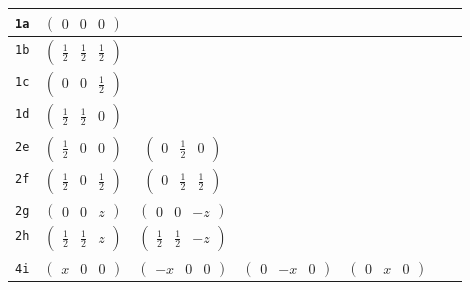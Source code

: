 \documentclass[fleqn,9pt,landscape]{jsarticle}
\begin{document}
\begin{center}
\begin{longtable}{ccccccc}
{\tt 1a} & $ \begin{pmatrix} 0 & 0 & 0 \end{pmatrix} $ & $  $ & $  $ & $  $ & $  $ & $  $ \\ \hline
{\tt 1b} & $ \begin{pmatrix} \frac{1}{2} & \frac{1}{2} & \frac{1}{2} \end{pmatrix} $ & $  $ & $  $ & $  $ & $  $ & $  $ \\ \hline
{\tt 1c} & $ \begin{pmatrix} 0 & 0 & \frac{1}{2} \end{pmatrix} $ & $  $ & $  $ & $  $ & $  $ & $  $ \\ \hline
{\tt 1d} & $ \begin{pmatrix} \frac{1}{2} & \frac{1}{2} & 0 \end{pmatrix} $ & $  $ & $  $ & $  $ & $  $ & $  $ \\ \hline
{\tt 2e} & $ \begin{pmatrix} \frac{1}{2} & 0 & 0 \end{pmatrix} $ & $ \begin{pmatrix} 0 & \frac{1}{2} & 0 \end{pmatrix} $ & $  $ & $  $ & $  $ & $  $ \\ \hline
{\tt 2f} & $ \begin{pmatrix} \frac{1}{2} & 0 & \frac{1}{2} \end{pmatrix} $ & $ \begin{pmatrix} 0 & \frac{1}{2} & \frac{1}{2} \end{pmatrix} $ & $  $ & $  $ & $  $ & $  $ \\ \hline
{\tt 2g} & $ \begin{pmatrix} 0 & 0 & z \end{pmatrix} $ & $ \begin{pmatrix} 0 & 0 & - z \end{pmatrix} $ & $  $ & $  $ & $  $ & $  $ \\ \hline
{\tt 2h} & $ \begin{pmatrix} \frac{1}{2} & \frac{1}{2} & z \end{pmatrix} $ & $ \begin{pmatrix} \frac{1}{2} & \frac{1}{2} & - z \end{pmatrix} $ & $  $ & $  $ & $  $ & $  $ \\ \hline
{\tt 4i} & $ \begin{pmatrix} x & 0 & 0 \end{pmatrix} $ & $ \begin{pmatrix} - x & 0 & 0 \end{pmatrix} $ & $ \begin{pmatrix} 0 & - x & 0 \end{pmatrix} $ & $ \begin{pmatrix} 0 & x & 0 \end{pmatrix} $ & $  $ & $  $ \\ \hline

\end{longtable}
\end{center}
\end{document}
